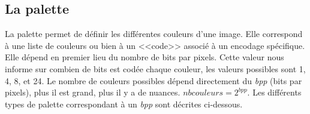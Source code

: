 \documentclass{article}
\begin{document}
		\subsection{La palette}
		La palette permet de définir les différentes couleurs d'une image. Elle correspond à une liste de couleurs ou bien à un <<code>> associé à un encodage spécifique. Elle dépend en premier lieu du nombre de bits par pixels. Cette valeur nous informe sur combien de bits est codée chaque couleur, les valeurs possibles sont 1, 4, 8, et 24. Le nombre de couleurs possibles dépend directement du \emph{bpp} (bits par pixels), plus il est grand, plus il y a de nuances. \begin{math}nbcouleurs = 2^{bpp}\end{math}. Les différents types de palette correspondant à un \emph{bpp} sont décrites ci-dessous.
		
\end{document}
